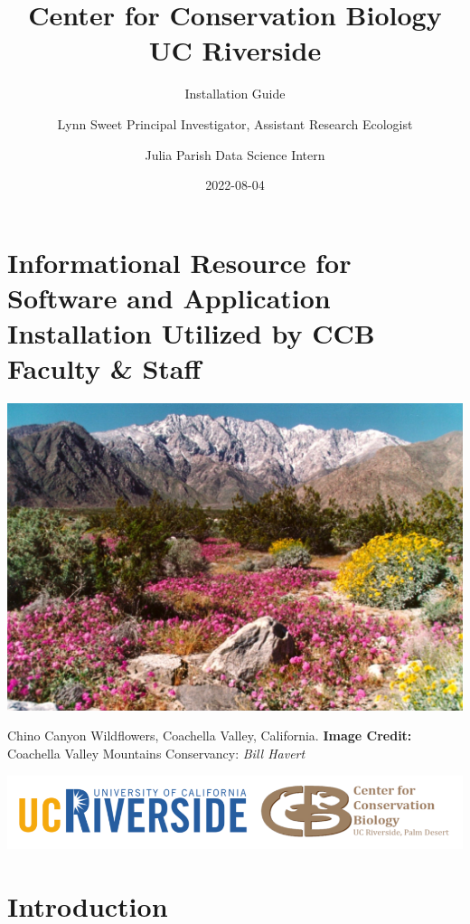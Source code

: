 \documentclass[
]{book}
\title{Center for Conservation Biology \textbar{} UC Riverside}
\subtitle{Installation Guide}
\author{Lynn Sweet \textbar{} Principal Investigator, Assistant Research Ecologist \and Julia Parish \textbar{} Data Science Intern}
\date{2022-08-04}
\begin{document}
\maketitle

{
\setcounter{tocdepth}{1}
\tableofcontents
}
\hypertarget{informational-resource-for-software-and-application-installation-utilized-by-ccb-faculty-staff}{%
\chapter*{Informational Resource for Software and Application Installation Utilized by CCB Faculty \& Staff}\label{informational-resource-for-software-and-application-installation-utilized-by-ccb-faculty-staff}}

\includegraphics[width=20.83in]{images/cvmc_billhavert}

Chino Canyon Wildflowers, Coachella Valley, California.
\textbf{Image Credit:} Coachella Valley Mountains Conservancy: \emph{Bill Havert}

\begin{center}\includegraphics[width=12.85in]{images/ucrccb} \end{center}

\hypertarget{intro}{%
\chapter{Introduction}\label{intro}}
\end{document}
